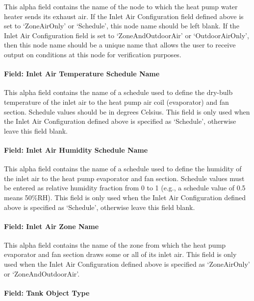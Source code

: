 This alpha field contains the name of the node to which the heat pump water heater sends its exhaust air. If the Inlet Air Configuration field defined above is set to `ZoneAirOnly' or `Schedule', this node name should be left blank. If the Inlet Air Configuration field is set to `ZoneAndOutdoorAir' or `OutdoorAirOnly', then this node name should be a unique name that allows the user to receive output on conditions at this node for verification purposes.

\paragraph{Field: Inlet Air Temperature Schedule Name}\label{field-inlet-air-temperature-schedule-name}

This alpha field contains the name of a schedule used to define the dry-bulb temperature of the inlet air to the heat pump air coil (evaporator) and fan section. Schedule values should be in degrees Celsius. This field is only used when the Inlet Air Configuration defined above is specified as `Schedule', otherwise leave this field blank.

\paragraph{Field: Inlet Air Humidity Schedule Name}\label{field-inlet-air-humidity-schedule-name}

This alpha field contains the name of a schedule used to define the humidity of the inlet air to the heat pump evaporator and fan section. Schedule values must be entered as relative humidity fraction from 0 to 1 (e.g., a schedule value of 0.5 means 50\%RH). This field is only used when the Inlet Air Configuration defined above is specified as `Schedule', otherwise leave this field blank.

\paragraph{Field: Inlet Air Zone Name}\label{field-inlet-air-zone-name}

This alpha field contains the name of the zone from which the heat pump evaporator and fan section draws some or all of its inlet air. This field is only used when the Inlet Air Configuration defined above is specified as `ZoneAirOnly' or `ZoneAndOutdoorAir'.

\paragraph{Field: Tank Object Type}\label{field-tank-object-type-000}

